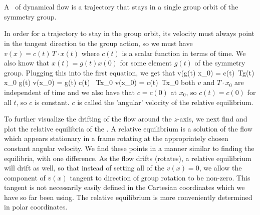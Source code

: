 \section{\Reqva}

A \reqva\ of dynamical flow is a trajectory that stays in a single group orbit of the symmetry group.

In order for a trajectory to stay in the group orbit, its velocity must always point in the tangent direction to the group action, so we must have $v\left(x\right) = c\left(t\right)\, T\cdot x\left(t\right)$ where $c\left(t\right)$ is a scalar function in terms of time. We also know that $x\left(t\right) = g\left(t\right) x\left(0\right)$ for some element $g\left(t\right)$ of the symmetry group. Plugging this into the first equation, we get that
\bea
v\left(g\left(t\right) x_0\right) = c\left(t\right)\, T\cdot g\left(t\right) x_0 \cont
g\left(t\right) v\left(x_0\right) = g\left(t\right) c\left(t\right) \, T\cdot x_0\cont
v\left(x_0\right) = c\left(t\right)\, T\cdot x_0
\eea
both $v$ and $T\cdot x_0$ are independent of time and we also have that $c = c\left(0\right)$ at $x_0$, so $c\left(t\right) = c\left(0\right)$ for all $t$, so $c$ is constant. $c$ is called the 'angular' velocity of the relative equilibrium.

To further visualize the drifting of the flow around the
$z$-axis, we next find and plot the relative equilibria of
the \cLe. A relative equilibrium is a solution of the flow
which appears stationary in a frame rotating at the
appropriately chosen constant angular velocity. We find these
points in a manner similar to finding the equilibria, with
one difference. As the flow drifts (rotates), a relative
equilibrium will drift as well, so that instead of setting
all of the $v(x)=0$, we allow the component of $v(x)$ tangent
to direction of group rotation to be non-zero. This tangent is not
necessarily easily defined in the
Cartesian coordinates which we have so far been using. The
relative equilibrium is more conveniently determined  in
polar coordinates.

